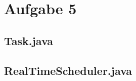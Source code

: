 \documentclass[numbers=noendperiod,10pt]{scrartcl}
\begin{document}
\section*{Aufgabe 5}

\subsection*{Task.java}

\subsection*{RealTimeScheduler.java}
	
\end{document}
